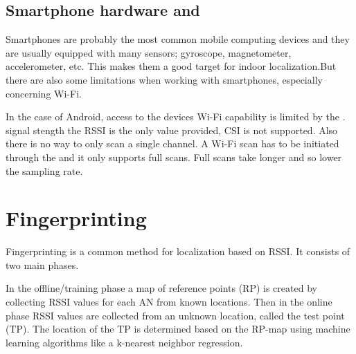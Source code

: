 \subsection{Smartphone hardware and }

Smartphones are probably the most common mobile computing devices and they are usually equipped with many sensors; gyroscope, magnetometer, accelerometer, etc. This makes them a good target for indoor localization.But there are also some limitations when working with smartphones, especially concerning Wi-Fi.

In the case of Android, access to the devices Wi-Fi capability is limited by the .  signal stength the RSSI is the only value provided, CSI is not supported. Also there is no way to only scan a single channel. A Wi-Fi scan has to be initiated through the  and it only supports full scans\cite{brouwers2014incremental}. Full scans take longer and so lower the sampling rate.







\section{Fingerprinting}

Fingerprinting is a common method for localization based on RSSI\cite{chapre2013RSSI}. It consists of two main phases.

In the offline/training phase a map of reference points (RP) is created by collecting RSSI values for each AN from known locations.
Then in the online phase RSSI values are collected from an unknown location, called the test point (TP). The location of the TP is determined based on the RP-map using machine learning algorithms like  a k-nearest neighbor regression\cite{JoseMaster}.

